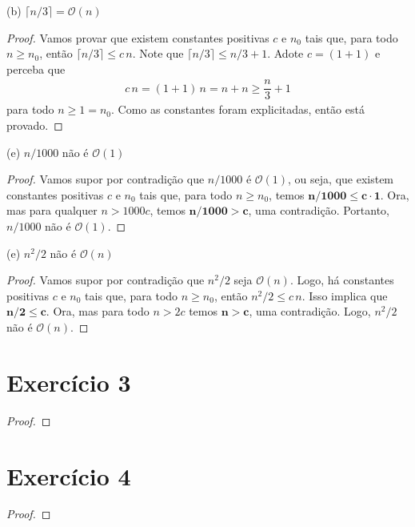 \documentclass{article}
\newcommand{\bigO}[1]{\ensuremath{\mathcal{O}(#1)}}
\begin{document}
(b) $\lceil n/3 \rceil = \bigO{n}$
\begin{proof}
Vamos provar que existem constantes positivas $c$ e $n_0$ tais que, para todo $n \geq n_0$, então $\lceil n/3 \rceil \leq c \, n$. Note que $\lceil n/3 \rceil \leq n/3 + 1$. Adote $c = (1+1)$ e perceba que
\begin{align*}
  c \, n = (1 + 1) \, n = n + n \geq \dfrac{n}{3} + 1
\end{align*}
para todo $n \geq 1 = n_0$. Como as constantes foram explicitadas, então está provado.

\end{proof}

(e) $n/1000$ não é $\bigO{1}$
\begin{proof}
Vamos supor por contradição que $n/1000$ é $\bigO{1}$, ou seja, que existem constantes positivas $c$ e $n_0$ tais que, para todo $n \geq n_0$, temos $\bm{n/1000 \leq c \cdot 1}$. Ora, mas para qualquer $n > 1000c$, temos $\bm{n/1000 > c}$, uma contradição. Portanto, $n/1000$ não é $\bigO{1}$.

\end{proof}

(e) $n^2/2$ não é $\bigO{n}$
\begin{proof}
Vamos supor por contradição que $n^2/2$ seja $\bigO{n}$. Logo, há constantes positivas $c$ e $n_0$ tais que, para todo $n \geq n_0$, então $n^2/2 \leq c \, n$. Isso implica que $\bm{n/2 \leq c}$. Ora, mas para todo $n > 2c$ temos $\bm{n > c}$, uma contradição. Logo, $n^2/2$ não é $\bigO{n}$.

\end{proof}

\section*{Exercício 3}

\begin{proof}
\end{proof}

\newpage

\section*{Exercício 4}

\begin{proof}
\end{proof}

\newpage
\end{document}
